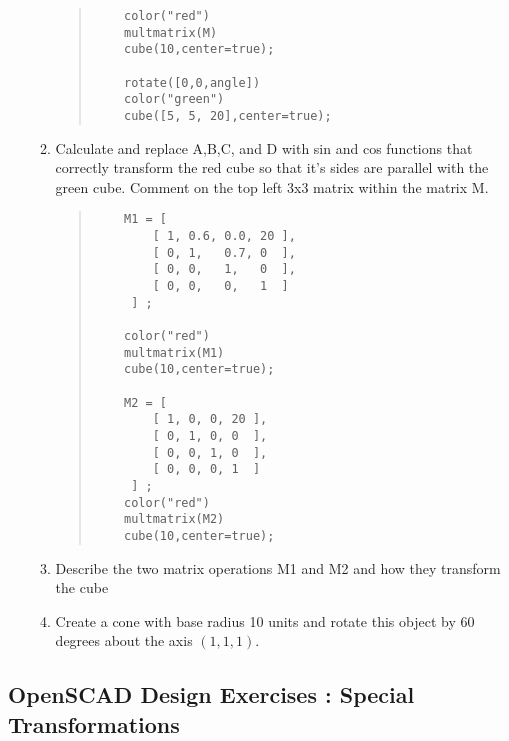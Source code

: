 \begin{enumerate}
\begin{enumerate}
\begin{quote}
\begin{verbatim}
	color("red") 
	multmatrix(M) 
	cube(10,center=true);
	
	rotate([0,0,angle]) 
	color("green") 
	cube([5, 5, 20],center=true);
 \end{verbatim}
\end{quote}
\item Calculate and replace A,B,C, and D with sin and cos functions that correctly transform the red cube so that it's sides are parallel with the green cube. Comment on the top left 3x3 matrix within the matrix M. 
 \begin{quote}
 \begin{verbatim}
    M1 = [	
		[ 1, 0.6, 0.0, 20 ], 
		[ 0, 1,   0.7, 0  ],
		[ 0, 0,   1,   0  ],
		[ 0, 0,   0,   1  ] 
	 ] ;
    
    color("red") 
    multmatrix(M1) 
    cube(10,center=true);
    
    M2 = [ 	
		[ 1, 0, 0, 20 ], 
		[ 0, 1, 0, 0  ],  
		[ 0, 0, 1, 0  ],
		[ 0, 0, 0, 1  ] 
	 ] ;
    color("red") 
    multmatrix(M2) 
    cube(10,center=true);
 \end{verbatim}
\end{quote}
\item Describe the two matrix operations M1 and M2 and how they transform the cube
\item Create a cone with base radius 10 units and rotate this object by 60 degrees about the axis $\left(1,1,1\right)$.
 \end{enumerate}


 
 \end{enumerate}%
 
\newpage
\subsection{OpenSCAD Design Exercises : Special Transformations}


